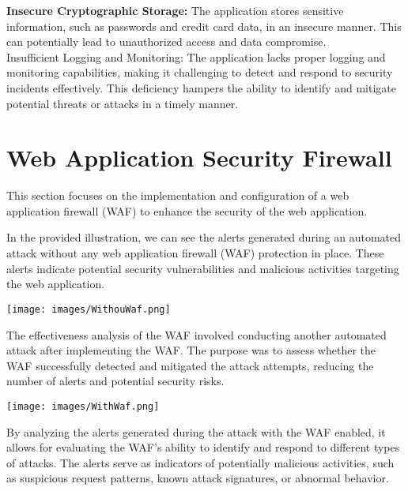 \documentclass[12pt]{article}
\begin{document}
\textbf{Insecure Cryptographic Storage:} The application stores sensitive information, such as passwords and credit card data, in an insecure manner. This can potentially lead to unauthorized access and data compromise.\\

Insufficient Logging and Monitoring: The application lacks proper logging and monitoring capabilities, making it challenging to detect and respond to security incidents effectively. This deficiency hampers the ability to identify and mitigate potential threats or attacks in a timely manner.

\newpage

\section{Web Application Security Firewall}
This section focuses on the implementation and configuration of a web application firewall (WAF) to enhance the security of the web application.

In the provided illustration, we can see the alerts generated during an automated attack without any web application firewall (WAF) protection in place. These alerts indicate potential security vulnerabilities and malicious activities targeting the web application.

\begin{center}
    \texttt{[image: images/WithouWaf.png]}
\end{center}

The effectiveness analysis of the WAF involved conducting another automated attack after implementing the WAF. The purpose was to assess whether the WAF successfully detected and mitigated the attack attempts, reducing the number of alerts and potential security risks.

\begin{center}
    \texttt{[image: images/WithWaf.png]}
\end{center}

By analyzing the alerts generated during the attack with the WAF enabled, it allows for evaluating the WAF's ability to identify and respond to different types of attacks. The alerts serve as indicators of potentially malicious activities, such as suspicious request patterns, known attack signatures, or abnormal behavior.\\
\end{document}
